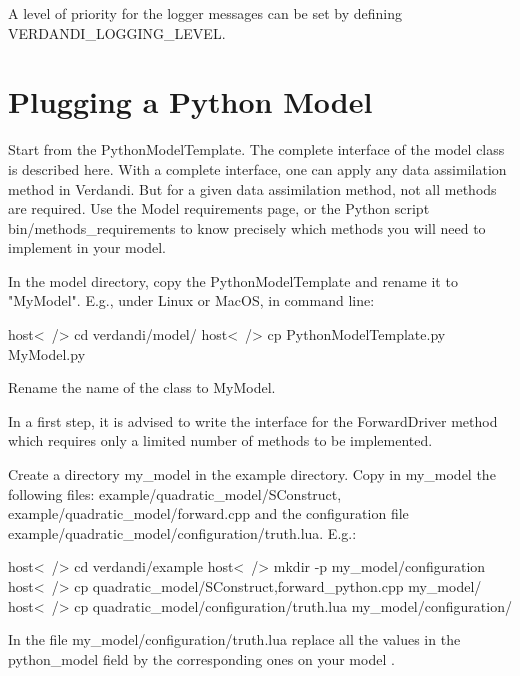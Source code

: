 \documentclass{tufte-book}
\begin{document}
\-A level of priority for the logger messages can be set by defining {\ttfamily \-V\-E\-R\-D\-A\-N\-D\-I\-\_\-\-L\-O\-G\-G\-I\-N\-G\-\_\-\-L\-E\-V\-E\-L}.


\hypertarget{plugging_python}{
\section{Plugging a Python Model}
\label{plugging_python}
}


Start from the PythonModelTemplate. The complete interface of the model class is described here. With a complete interface, one can apply any data assimilation method in Verdandi. But for a given data assimilation method, not all methods are required. Use the Model requirements page, or the Python script
 {\ttfamily  bin/methods\_requirements} to know precisely which methods you will need to implement in your model.

In the model directory, copy the PythonModelTemplate and rename it to "MyModel". E.g., under Linux or MacOS, in command line:

\begin{frame_bash}
host<~/> cd verdandi/model/
host<~/> cp PythonModelTemplate.py MyModel.py
\end{frame_bash}


Rename the name of the class to MyModel.

In a first step, it is advised to write the interface for the ForwardDriver method which requires only a limited number of methods to be implemented.

Create a directory  {\ttfamily my\_model} in the example directory. Copy in  {\ttfamily my\_model} the following files: {\ttfamily example/quadratic\-\_\-model/\-S\-Construct}, {\ttfamily example/quadratic\-\_\-model/forward.\-cpp} and the configuration file {\ttfamily example/quadratic\-\_\-model/configuration/truth.\-lua}. \-E.\-g.\-:

\begin{frame_bash}
host<~/> cd verdandi/example
host<~/> mkdir -p my_model/configuration
host<~/> cp quadratic_model/{SConstruct,forward_python.cpp} my_model/
host<~/> cp quadratic_model/configuration/truth.lua my_model/configuration/
\end{frame_bash}


In the file  {\ttfamily my\_model/configuration/truth.\-lua} replace all the values in the python\_model field by the corresponding ones on your model .
\end{document}
